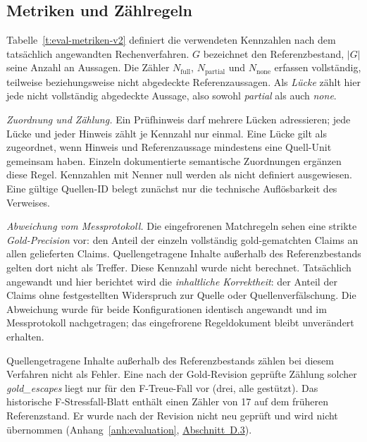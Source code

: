 \subsection{Metriken und Zählregeln}
\label{sec:eval-metriken}

Tabelle~\ref{t:eval-metriken-v2} definiert die verwendeten
Kennzahlen nach dem tatsächlich angewandten Rechenverfahren.
$G$ bezeichnet den Referenzbestand, $|G|$ seine Anzahl an Aussagen.
Die Zähler $N_{\mathrm{full}}$, $N_{\mathrm{partial}}$ und
$N_{\mathrm{none}}$ erfassen vollständig, teilweise beziehungsweise
nicht abgedeckte Referenzaussagen. Als \emph{Lücke} zählt hier jede
nicht vollständig abgedeckte Aussage, also sowohl \emph{partial}
als auch \emph{none}.



\emph{Zuordnung und Zählung.} Ein Prüfhinweis darf mehrere Lücken
adressieren; jede Lücke und jeder Hinweis zählt je Kennzahl nur einmal.
Eine Lücke gilt als zugeordnet, wenn Hinweis und Referenzaussage
mindestens eine Quell-Unit gemeinsam haben. Einzeln dokumentierte
semantische Zuordnungen ergänzen diese Regel. Kennzahlen mit Nenner
null werden als nicht definiert ausgewiesen. Eine gültige Quellen-ID
belegt zunächst nur die technische Auflösbarkeit des Verweises.

\begin{samepage}
\emph{Abweichung vom Messprotokoll.} Die eingefrorenen Matchregeln
sehen eine strikte \emph{Gold-Precision} vor: den Anteil der einzeln
vollständig gold-gematchten Claims an allen gelieferten Claims.
Quellengetragene Inhalte außerhalb des Referenzbestands gelten dort
nicht als Treffer. Diese Kennzahl wurde nicht berechnet.
Tatsächlich angewandt und hier berichtet wird die \emph{inhaltliche
Korrektheit}: der Anteil der Claims ohne festgestellten Widerspruch
zur Quelle oder Quellenverfälschung. Die Abweichung wurde für beide
Konfigurationen identisch angewandt und im Messprotokoll nachgetragen;
das eingefrorene Regeldokument bleibt unverändert erhalten.
\par
\end{samepage}


Quellengetragene Inhalte außerhalb des Referenzbestands zählen bei
diesem Verfahren nicht als Fehler. Eine nach der Gold-Revision
geprüfte Zählung solcher \emph{gold\_escapes} liegt nur für den
F-Treue-Fall vor (drei, alle gestützt). Das historische
F-Stressfall-Blatt enthält einen Zähler von 17 auf dem früheren
Referenzstand. Er wurde nach der Revision nicht neu geprüft und wird
nicht übernommen (Anhang~\ref{anh:evaluation},
\hyperref[anh:referenzpruefung]{Abschnitt~D.3}).

